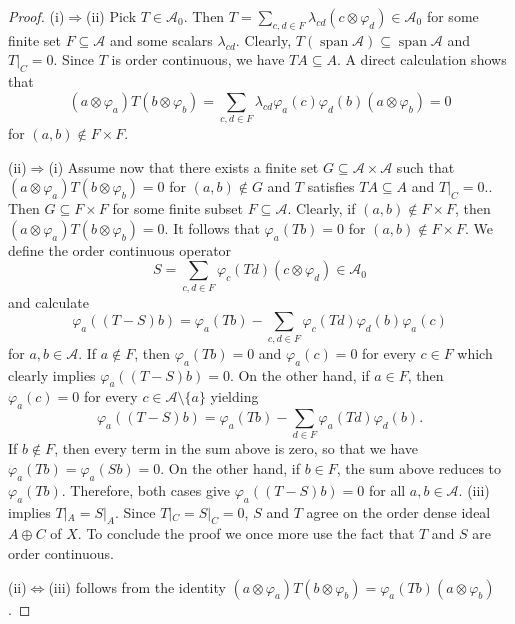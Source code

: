 \documentclass[12pt,reqno]{amsart}
\theoremstyle{plain}
\theoremstyle{definition}
\DeclareMathOperator{\Span}{span}
\begin{document}
\begin{proof}
    (i)$\Rightarrow$(ii) Pick $T\in \mathcal A_0$. Then $T=\sum_{c,d\in F} \lambda_{cd}(c\otimes \varphi_d) \in \mathcal A_0$ for some finite set $F\subseteq \mathcal A$ and some scalars $\lambda_{cd}$. Clearly, $T(\Span \mathcal A)\subseteq \Span \mathcal A$ and $T|_C=0$. Since $T$ is order continuous, we have $TA\subseteq A$. A direct calculation shows that 
    $$(a\otimes \varphi_a)T(b\otimes \varphi_b)=\sum_{c,d\in F} \lambda_{cd} \varphi_a(c)\varphi_d(b) (a\otimes \varphi_b)=0$$ for $(a,b)\notin F\times F$. 

    (ii)$\Rightarrow$(i) Assume now that there exists a finite set $G\subseteq \mathcal A\times \mathcal A$ such that $(a\otimes \varphi_a)T(b\otimes \varphi_b)=0$ for $(a,b)\notin G$ and $T$ satisfies $TA\subseteq A$ and $T|_C=0$.. Then $G\subseteq F\times F$ for some finite subset $F\subseteq \mathcal A$. Clearly, if $(a,b)\notin F\times F$, then $(a\otimes \varphi_a)T(b\otimes \varphi_b)=0$. It follows that $\varphi_a(Tb)=0$ for $(a,b)\notin F\times F$. We define the order continuous operator
    $$S=\sum_{c,d\in F}\varphi_c(Td)(c\otimes \varphi_d)\in \mathscr A_0$$
    and calculate
    $$\varphi_a((T-S)b)=\varphi_a(Tb)-\sum_{c,d\in F}\varphi_c(Td)\varphi_d(b)\varphi_a(c)$$
    for $a,b\in \mathcal A$. If $a\notin F$, then $\varphi_a(Tb)=0$ and $\varphi_a(c)=0$ for every $c\in F$ which clearly implies $\varphi_a((T-S)b)=0$. 
     On the other hand, if $a\in F$, then $\varphi_a(c)=0$ for every $c\in \mathcal A\setminus \{a\}$ yielding
    $$\varphi_a((T-S)b)=\varphi_a(Tb)-\sum_{d\in F}\varphi_a(Td)\varphi_d(b).$$
    If $b\notin F$, then every term in the sum above is zero, so that we have $\varphi_a(Tb)=\varphi_a(Sb)=0$. On the other hand, if $b\in F$, the sum above reduces to $\varphi_a(Tb)$. 
    Therefore, both cases give $\varphi_a((T-S)b)=0$ for all $a,b\in \mathcal A$.  (iii)  implies $T|_A=S|_A$.  Since $T|_C=S|_C=0$, $S$ and $T$ agree on the order dense ideal $A\oplus C$ of $X$. To conclude the proof we once more use the fact that $T$ and $S$ are order continuous. 

    (ii)$\Leftrightarrow$(iii) follows from the identity
    $(a\otimes \varphi_a)T(b\otimes \varphi_b)=\varphi_a(Tb)(a\otimes\varphi_b)$. 
\end{proof}
\end{document}
